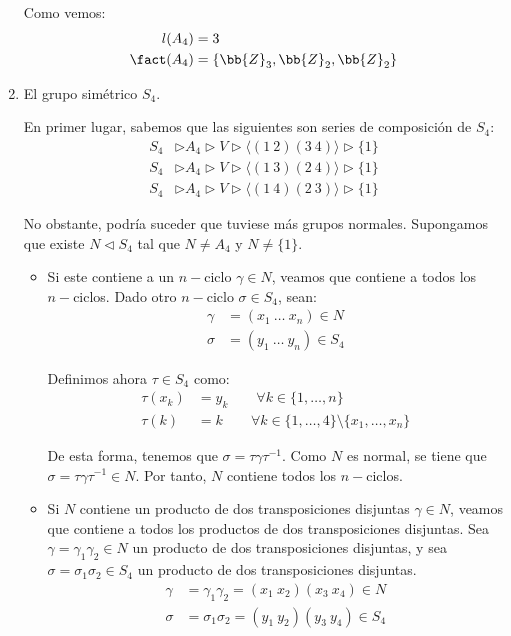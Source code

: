 \begin{ejercicio}
\begin{enumerate}
        Como vemos:
        \begin{align*}
            l(A_4) &= 3 \\
            \fact(A_4) &= \{\bb{Z}_3, \bb{Z}_2, \bb{Z}_2\}
        \end{align*}
        \item El grupo simétrico $S_4$.
        
        En primer lugar, sabemos que las siguientes son series de composición de $S_4$:
        \begin{align*}
            S_4 &\rhd A_4 \rhd V \rhd \langle (1\ 2)(3\ 4) \rangle  \rhd \{1\} \\
            S_4 &\rhd A_4 \rhd V \rhd \langle (1\ 3)(2\ 4) \rangle  \rhd \{1\} \\
            S_4 &\rhd A_4 \rhd V \rhd \langle (1\ 4)(2\ 3) \rangle  \rhd \{1\}
        \end{align*}

        No obstante, podría suceder que tuviese más grupos normales. Supongamos que existe $N\lhd S_4$ tal que $N\neq A_4$ y $N\neq \{1\}$.
        \begin{itemize}
            \item Si este contiene a un $n-$ciclo $\gamma\in N$, veamos que contiene a todos los $n-$ciclos. Dado otro $n-$ciclo $\sigma\in S_4$, sean:
            \begin{align*}
                \gamma &= (x_1\ \dots\ x_n)\in N \\
                \sigma &= (y_1\ \dots\ y_n)\in S_4
            \end{align*}

            Definimos ahora $\tau\in S_4$ como:
            \begin{align*}
                \tau(x_k) &= y_k\qquad \forall k\in \{1,\ldots,n\} \\
                \tau(k) &= k\qquad \forall k\in \{1,\ldots,4\}\setminus\{x_1,\ldots,x_n\}
            \end{align*}

            De esta forma, tenemos que $\sigma=\tau\gamma\tau^{-1}$. Como $N$ es normal, se tiene que $\sigma=\tau\gamma\tau^{-1}\in N$. Por tanto, $N$ contiene todos los $n-$ciclos.

            \item Si $N$ contiene un producto de dos transposiciones disjuntas $\gamma\in N$, veamos que contiene a todos los productos de dos transposiciones disjuntas. Sea $\gamma=\gamma_1\gamma_2\in N$ un producto de dos transposiciones disjuntas, y sea $\sigma=\sigma_1\sigma_2\in S_4$ un producto de dos transposiciones disjuntas.
            \begin{align*}
                \gamma &= \gamma_1\gamma_2=(x_1\ x_2)(x_3\ x_4)\in N \\
                \sigma &= \sigma_1\sigma_2=(y_1\ y_2)(y_3\ y_4)\in S_4
            \end{align*}
            

\end{itemize}
\end{enumerate}
\end{ejercicio}
